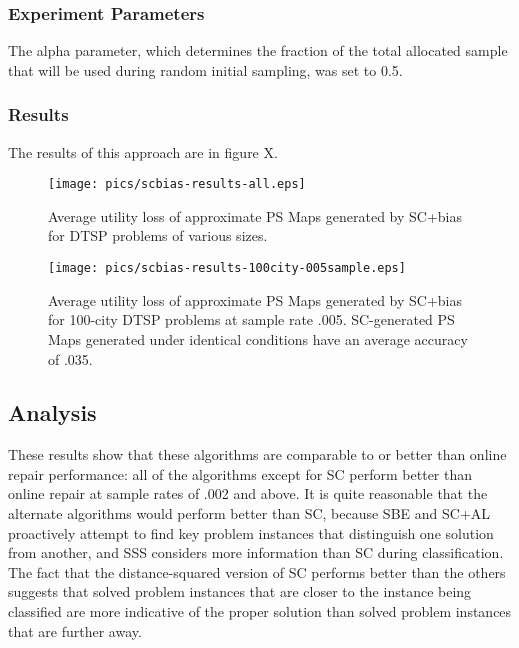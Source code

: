 \subsubsection{Experiment Parameters} 

The alpha parameter, which determines the fraction of the total allocated sample that will be used during random initial sampling, was set to 0.5.

\subsubsection{Results} The results of this approach are in figure X. 




\begin{figure}
\begin{center}
\texttt{[image: pics/scbias-results-all.eps]}
\caption{Average utility loss of approximate PS Maps generated by SC+bias for DTSP problems of various sizes.}
\label{fig:scbias-results-all}
\end{center}
\end{figure}

\begin{figure}
\begin{center}
\texttt{[image: pics/scbias-results-100city-005sample.eps]}
\caption{Average utility loss of approximate PS Maps generated by SC+bias for 100-city DTSP problems at sample rate .005.  SC-generated PS Maps generated under identical conditions have an average accuracy of .035.}
\label{fig:scbias-results-100city-005sample}
\end{center}
\end{figure}


\subsection{Analysis}

These results show that these algorithms are comparable to or better than online repair performance:  all of the algorithms except for SC perform better than online repair at sample rates of .002 and above.  It is quite reasonable that the alternate algorithms would perform better than SC, because SBE and SC+AL proactively attempt to find key problem instances that distinguish one solution from another, and SSS considers more information than SC during classification.  The fact that the distance-squared version of SC performs better than the others suggests that solved problem instances that are closer to the instance being classified are more indicative of the proper solution than solved problem instances that are further away.

